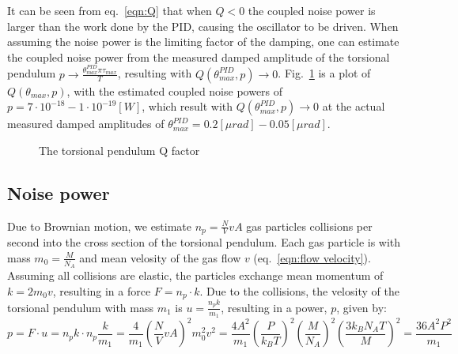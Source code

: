 \documentclass[\main/master.tex]{subfiles}
\begin{document}
It can be seen from eq.~\ref{eqn:Q} that when $Q<0$ the coupled noise power is larger than the work done by the PID, causing the oscillator to be driven. When assuming the noise power is the limiting factor of the damping, one can estimate the coupled noise power from the measured damped amplitude of the torsional pendulum $p \rightarrow \frac{ \theta_{max}^{PID}\pi\tau_{max}}{T}$, resulting with $Q(\theta_{max}^{PID},p)	\rightarrow 0$. Fig.~\ref{fig:Q factor} is a plot of $Q(\theta_{max},p)$, with the estimated coupled noise powers  of $p= 7\cdot 10^{-18} - 1\cdot 10^{-19} [W]$, which result  with $Q(\theta_{max}^{PID},p) \rightarrow 0$ at the actual measured damped amplitudes of $\theta_{max}^{PID}= 0.2 [\mu rad] -0.05 [\mu rad]$.

\begin{figure}[htbp]
	\centering
	\caption[The torsional pendulum Q factor]{The torsional pendulum Q factor}
	\label{fig:Q factor}
\end{figure} 
\FloatBarrier

\subsection{Noise power}
Due to Brownian motion, we estimate $n_p= \frac{N}{V}v A$ gas particles collisions per second into the cross section of the torsional pendulum. Each gas particle is with mass $m_0 = \frac{M}{N_A}$ and mean velosity of the gas flow $v$ (eq.~\ref{eqn:flow velocity}). Assuming all collisions are elastic, the particles exchange mean momentum of $k=2m_0v$, resulting in a force $F = n_p\cdot k$. Due to the collisions, the velosity of the torsional pendulum with mass $m_1$ is $ u =\frac{ n_p k}{m_1}$, resulting in a power, $p$, given by:
\begin{equation}
p = F\cdot u =  n_p k \cdot n_p\frac{k}{m_1} =\frac{4}{m_1}(\frac{N}{V}v A)^2m_0^2v^2=\frac{4A^2}{m_1}(\frac{P}{k_B T})^2(\frac{M}{N_A})^2 (\frac{3 k_B N_A T}{M})^2 =\frac{36A^2P^2}{m_1} 
\label{eqn:Brownian power}
\end{equation}
\end{document}
